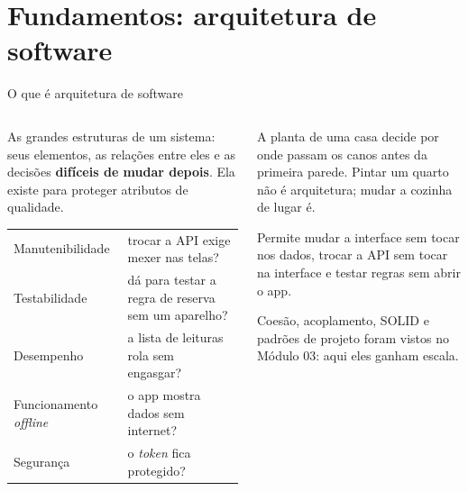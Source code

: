 \section{Fundamentos: arquitetura de software}

\begin{frame}{O que é arquitetura de software}
  \begin{columns}[T]
    \begin{column}{0.52\textwidth}
      \begin{definicao}[Arquitetura]
        As grandes estruturas de um sistema: seus elementos, as relações entre eles e as decisões \textbf{difíceis de mudar depois}. Ela existe para proteger atributos de qualidade.
      \end{definicao}
      \scriptsize
      \begin{tabularx}{\linewidth}{@{}l L@{}}
        \toprule
         &  \\
        \midrule
        Manutenibilidade & trocar a API exige mexer nas telas? \\
        Testabilidade & dá para testar a regra de reserva sem um aparelho? \\
        Desempenho & a lista de leituras rola sem engasgar? \\
        Funcionamento \emph{offline} & o app mostra dados sem internet? \\
        Segurança & o \emph{token} fica protegido? \\
        \bottomrule
      \end{tabularx}
    \end{column}
    \begin{column}{0.46\textwidth}
      \begin{analogia}
        A planta de uma casa decide por onde passam os canos antes da primeira parede. Pintar um quarto não é arquitetura; mudar a cozinha de lugar é.
      \end{analogia}
      \begin{conceito}
        Permite mudar a interface sem tocar nos dados, trocar a API sem tocar na interface e testar regras sem abrir o app.
      \end{conceito}
      \begin{dica}
        Coesão, acoplamento, SOLID e padrões de projeto foram vistos no Módulo 03: aqui eles ganham escala.
      \end{dica}
    \end{column}
  \end{columns}
\end{frame}


